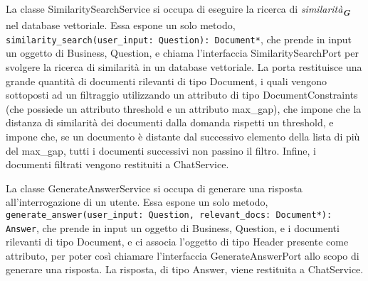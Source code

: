 \label{sec:similarity_search_service}
La classe SimilaritySearchService si occupa di eseguire la ricerca di \emph{similarità}\textsubscript{\textbf{\textit{G}}} nel database vettoriale. Essa espone un solo metodo, \texttt{similarity\_search(user\_input: Question): Document*}, che prende in input un oggetto di Business, Question, e chiama l'interfaccia SimilaritySearchPort per svolgere la ricerca di similarità in un database vettoriale. La porta restituisce una grande quantità di documenti rilevanti di tipo Document, i quali vengono sottoposti ad un filtraggio utilizzando un attributo di tipo DocumentConstraints (che possiede un attributo threshold e un attributo max\_gap), che impone che la distanza di similarità dei documenti dalla domanda rispetti un threshold, e impone che, se un documento è distante dal successivo elemento della lista di più del max\_gap, tutti i documenti successivi non passino il filtro. Infine, i documenti filtrati vengono restituiti a ChatService.

\label{sec:generate_answer_service}
La classe GenerateAnswerService si occupa di generare una risposta all'interrogazione di un utente. Essa espone un solo metodo, \texttt{generate\_answer(user\_input: Question, relevant\_docs: Document*): Answer}, che prende in input un oggetto di Business, Question, e i documenti rilevanti di tipo Document, e ci associa l'oggetto di tipo Header presente come attributo, per poter così chiamare l'interfaccia GenerateAnswerPort allo scopo di generare una risposta. La risposta, di tipo Answer, viene restituita a ChatService.


